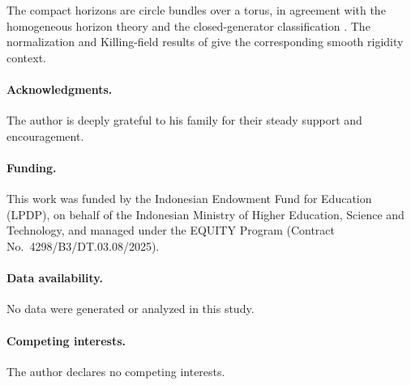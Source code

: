 \documentclass[10pt,a4paper]{article}
\numberwithin{equation}{section}
\theoremstyle{definition}
\theoremstyle{remark}
\begin{document}
The compact horizons are circle bundles over a torus, in agreement with
the homogeneous horizon theory \cite{ChruscielRendall1995} and the
closed-generator classification \cite{BustamanteReiris2021}.
The normalization and Killing-field results of
\cite{ReirisBustamante2021,PetersenRacz2023} give the corresponding
smooth rigidity context.

\paragraph{Acknowledgments.}
The author is deeply grateful to his family for their steady support and
encouragement.

\paragraph{Funding.}
This work was funded by the Indonesian Endowment Fund for Education (LPDP),
on behalf of the Indonesian Ministry of Higher Education, Science and
Technology, and managed under the EQUITY Program
(Contract No.~4298/B3/DT.03.08/2025).

\paragraph{Data availability.}
No data were generated or analyzed in this study.

\paragraph{Competing interests.}
The author declares no competing interests.
\end{document}
